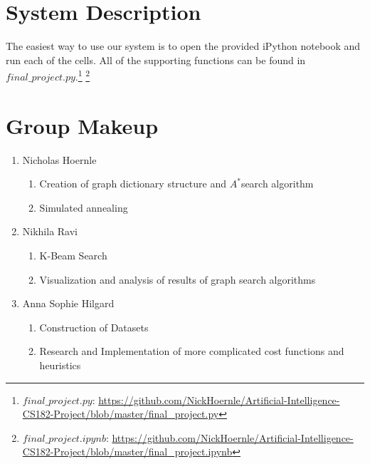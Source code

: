 \documentclass[11pt]{article}
\begin{document}
\newpage
\appendix
\section{System Description}

The easiest way to use our system is to open the provided iPython notebook and run each of the cells. All of the supporting functions can be found in $final\_project.py$.\footnote{$final\_project.py$: \url{https://github.com/NickHoernle/Artificial-Intelligence-CS182-Project/blob/master/final_project.py}} \footnote{$final\_project.ipynb$: \url{https://github.com/NickHoernle/Artificial-Intelligence-CS182-Project/blob/master/final_project.ipynb}}

\section{Group Makeup}

\begin{enumerate}
\item Nicholas Hoernle
\begin{enumerate}
\item Creation of graph dictionary structure and $A^{*}$search algorithm
\item Simulated annealing
\end{enumerate}
\item Nikhila Ravi
\begin{enumerate}
\item K-Beam Search
\item Visualization and analysis of results of graph search algorithms
\end{enumerate}
\item Anna Sophie Hilgard
\begin{enumerate}
\item Construction of Datasets
\item Research and Implementation of more complicated cost functions and heuristics
\end{enumerate}
\end{enumerate}
\end{document}
